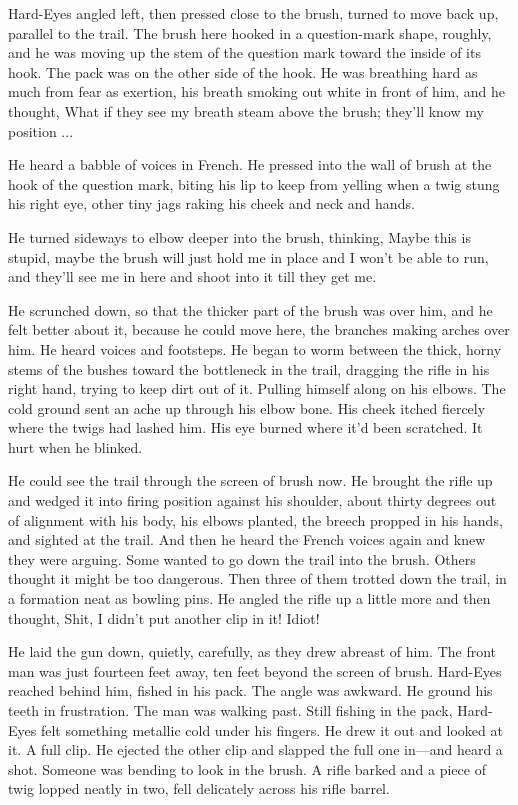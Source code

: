 Hard-Eyes angled left, then pressed close to the brush, turned to move back up, parallel to the trail. The brush here hooked in a question-mark shape, roughly, and he was moving up the stem of the question mark toward the inside of its hook. The pack was on the other side of the hook. He was breathing hard as much from fear as exertion, his breath smoking out white in front of him, and he thought, What if they see my breath steam above the brush; they'll know my position ...

He heard a babble of voices in French. He pressed into the wall of brush at the hook of the question mark, biting his lip to keep from yelling when a twig stung his right eye, other tiny jags raking his cheek and neck and hands.

He turned sideways to elbow deeper into the brush, thinking, Maybe this is stupid, maybe the brush will just hold me in place and I won't be able to run, and they'll see me in here and shoot into it till they get me.

He scrunched down, so that the thicker part of the brush was over him, and he felt better about it, because he could move here, the branches making arches over him. He heard voices and footsteps. He began to worm between the thick, horny stems of the bushes toward the bottleneck in the trail, dragging the rifle in his right hand, trying to keep dirt out of it. Pulling himself along on his elbows. The cold ground sent an ache up through his elbow bone. His cheek itched fiercely where the twigs had lashed him. His eye burned where it'd been scratched. It hurt when he blinked.

He could see the trail through the screen of brush now. He brought the rifle up and wedged it into firing position against his shoulder, about thirty degrees out of alignment with his body, his elbows planted, the breech propped in his hands, and sighted at the trail. And then he heard the French voices again and knew they were arguing. Some wanted to go down the trail into the brush. Others thought it might be too dangerous. Then three of them trotted down the trail, in a formation neat as bowling pins. He angled the rifle up a little more and then thought, Shit, I didn't put another clip in it! Idiot!

He laid the gun down, quietly, carefully, as they drew abreast of him. The front man was just fourteen feet away, ten feet beyond the screen of brush. Hard-Eyes reached behind him, fished in his pack. The angle was awkward. He ground his teeth in frustration. The man was walking past. Still fishing in the pack, Hard-Eyes felt something metallic cold under his fingers. He drew it out and looked at it. A full clip. He ejected the other clip and slapped the full one in---and heard a shot. Someone was bending to look in the brush. A rifle barked and a piece of twig lopped neatly in two, fell delicately across his rifle barrel.

